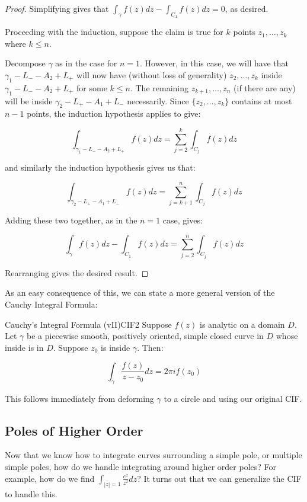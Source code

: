 \begin{proof}
Simplifying gives that $\int_{\gamma} f(z)dz - \int_{C_1}f(z)dz = 0$, as desired.

Proceeding with the induction, suppose the claim is true for $k$ points $z_1,\dots, z_k$ where $k\le n$.

Decompose $\gamma$ as in the case for $n = 1$. However, in this case, we will have that $\gamma_1 - L_- - A_2 + L_+$ will now have (without loss of generality) $z_2,\dots,z_k$ inside $\gamma_1 - L_- - A_2 + L_+$ for some $k\le n$. The remaining $z_{k+1},\dots,z_n$ (if there are any) will be inside $\gamma_2 - L_+ - A_1 + L_-$ necessarily. Since $\{z_2,\dots,z_k\}$ contains at most $n-1$ points, the induction hypothesis applies to give:

$$\int_{\gamma_1 - L_- - A_2 + L_+} f(z)dz = \sum_{j = 2}^k \int_{C_j} f(z)dz$$

\noin and similarly the induction hypothesis gives us that:

$$\int_{\gamma_2 - L_+ - A_1 + L_-} f(z)dz = \sum_{j = k+1}^n \int_{C_j} f(z)dz$$

Adding these two together, as in the $n=1$ case, gives:

$$\int_{\gamma} f(z)dz - \int_{C_1}f(z)dz = \sum_{j = 2}^n \int_{C_j}f(z)dz$$

Rearranging gives the desired result.
\end{proof}

As an easy consequence of this, we can state a more general version of the Cauchy Integral Formula:

\begin{corbo}{Cauchy's Integral Formula (vII)}{CIF2}
Suppose $f(z)$ is analytic on a domain $D$. Let $\gamma$ be a piecewise smooth, positively oriented, simple closed curve in $D$ whose inside is in $D$. Suppose $z_0$ is inside $\gamma$. Then:

$$\int_{\gamma} \frac{f(z)}{z-z_0}dz = 2\pi if(z_0)$$
\end{corbo}

This follows immediately from deforming $\gamma$ to a circle and using our original CIF.

\subsection{Poles of Higher Order}

Now that we know how to integrate curves surrounding a simple pole, or multiple simple poles, how do we handle integrating around higher order poles? For example, how do we find $\int_{|z|=1}\frac{e^z}{z^2}dz$? It turns out that we can generalize the CIF to handle this.

